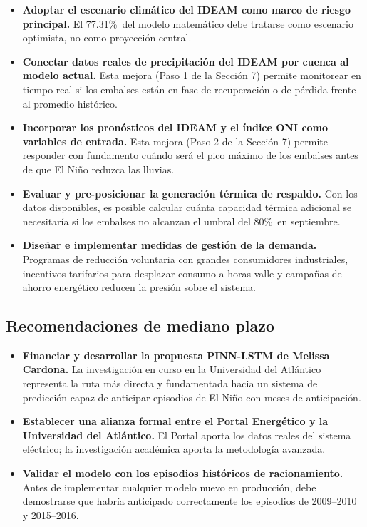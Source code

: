 \documentclass[11pt,a4paper]{article}
\newcommand{\METAXM}{80\%}
\newcommand{\PREDAGOSTO}{77.31\%}
\begin{document}
\begin{itemize}[leftmargin=*,itemsep=4pt]
\item \textbf{Adoptar el escenario climático del IDEAM como marco de riesgo principal.} El \PREDAGOSTO\ del modelo matemático debe tratarse como escenario optimista, no como proyección central.
\item \textbf{Conectar datos reales de precipitación del IDEAM por cuenca al modelo actual.} Esta mejora (Paso 1 de la Sección 7) permite monitorear en tiempo real si los embalses están en fase de recuperación o de pérdida frente al promedio histórico.
\item \textbf{Incorporar los pronósticos del IDEAM y el índice ONI como variables de entrada.} Esta mejora (Paso 2 de la Sección 7) permite responder con fundamento cuándo será el pico máximo de los embalses antes de que El Niño reduzca las lluvias.
\item \textbf{Evaluar y pre-posicionar la generación térmica de respaldo.} Con los datos disponibles, es posible calcular cuánta capacidad térmica adicional se necesitaría si los embalses no alcanzan el umbral del \METAXM\ en septiembre.
\item \textbf{Diseñar e implementar medidas de gestión de la demanda.} Programas de reducción voluntaria con grandes consumidores industriales, incentivos tarifarios para desplazar consumo a horas valle y campañas de ahorro energético reducen la presión sobre el sistema.
\end{itemize}

\subsection{Recomendaciones de mediano plazo}

\begin{itemize}[leftmargin=*,itemsep=4pt]
\item \textbf{Financiar y desarrollar la propuesta PINN-LSTM de Melissa Cardona.} La investigación en curso en la Universidad del Atlántico representa la ruta más directa y fundamentada hacia un sistema de predicción capaz de anticipar episodios de El Niño con meses de anticipación.
\item \textbf{Establecer una alianza formal entre el Portal Energético y la Universidad del Atlántico.} El Portal aporta los datos reales del sistema eléctrico; la investigación académica aporta la metodología avanzada.
\item \textbf{Validar el modelo con los episodios históricos de racionamiento.} Antes de implementar cualquier modelo nuevo en producción, debe demostrarse que habría anticipado correctamente los episodios de 2009--2010 y 2015--2016.
\end{itemize}
\end{document}
